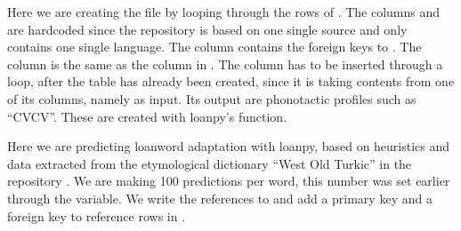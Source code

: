 \documentclass[letterpaper,10pt,english]{sphinxmanual}
\begin{document}
\sphinxAtStartPar
Here we are creating the file  by looping
through the rows of . The columns  and
 are hard\sphinxhyphen{}coded since the repository is based on one single source
and only contains one single language. The column  contains
the foreign keys to . The column  is the
same as the column  in . The column
 has to be inserted through a loop, after the table
 has already been created, since it is taking contents
from one of its columns, namely  as input. Its output are
phonotactic profiles such as “CVCV”. These are created with loanpy’s
function.

\begin{sphinxVerbatim}[commandchars=\\\{\}]
   \PYG{p}{[}\PYG{p}{]} 
    \PYG{p}{[}  \PYG{p}{]}
      
\end{sphinxVerbatim}

\sphinxAtStartPar
Here we are predicting loanword adaptation with loanpy, based on heuristics
and data extracted from the etymological dictionary “West Old Turkic”
in the repository . We
are making 100 predictions per word, this number was set earlier through the
 variable. We write the references to
 and add a primary key and a foreign key to reference
rows in .
\end{document}
